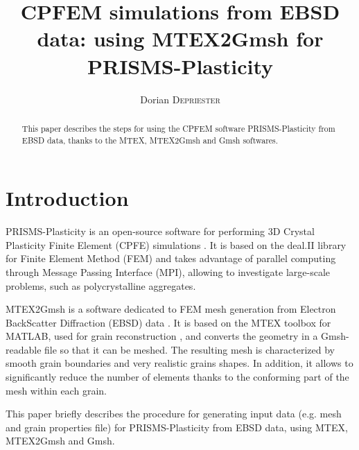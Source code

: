 \documentclass[a4paper]{scrartcl}
\title{CPFEM simulations from EBSD data: using MTEX2Gmsh for PRISMS-Plasticity}
\author{Dorian \textsc{Depriester}}
\newcommand{\matlab}{MATLAB\textsuperscript{\textregistered}}
\begin{document}

\maketitle

\begin{abstract}
	This paper describes the steps for using the CPFEM software PRISMS-Plasticity from EBSD data, thanks to the MTEX, MTEX2Gmsh and Gmsh softwares.
\end{abstract}

\tableofcontents

\section{Introduction}
	PRISMS-Plasticity is an open-source software for performing 3D Crystal Plasticity Finite Element (CPFE) simulations \cite{prisms}. It is based on the deal.II library \cite{dealII} for Finite Element Method (FEM) and takes advantage of parallel computing through Message Passing Interface (MPI), allowing to investigate large-scale problems, such as polycrystalline aggregates. 
	
	MTEX2Gmsh is a software dedicated to FEM mesh generation from Electron BackScatter Diffraction (EBSD) data \cite{MTEX2Gmsh}. It is based on the MTEX toolbox for \matlab{}, used for grain reconstruction \cite{mtex}, and converts the geometry in a Gmsh-readable file \cite{gmsh} so that it can be meshed. The resulting mesh is characterized by smooth grain boundaries and very realistic grains shapes. In addition, it allows to significantly reduce the number of elements thanks to the conforming part of the mesh within each grain.
	
	This paper briefly describes the procedure for generating input data (e.g. mesh and grain properties file) for PRISMS-Plasticity from EBSD data, using MTEX, MTEX2Gmsh and Gmsh.
\end{document}
